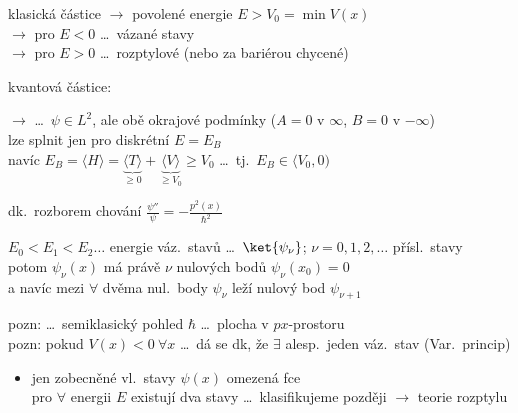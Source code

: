 klasická částice $\to$ povolené energie $E > V_0 = \min V(x)$ \\
\hspace*{3.2cm} $\to$ pro $E < 0$ \dots\ vázané stavy \\
\hspace*{3.2cm} $\to$ pro $E > 0$ \dots\ rozptylové (nebo za bariérou chycené)

kvantová částice:
\begin{veta}
 $\to$  \dots\ $\psi\in L^2$, ale obě okrajové podmínky
($A = 0$ v $\infty$, $B = 0$ v $-\infty$) \\
lze splnit jen pro diskrétní $E = E_B$ \\
navíc \quad $E_B = \langle H\rangle = \underbrace{\langle T\rangle}_{\geq0} + \underbrace{\langle V\rangle}_{\geq V_0} \geq V_0$
\quad \dots\ tj.\ $E_B\in\langle V_0, 0)$
\end{veta}

\begin{veta}
dk.\ rozborem chování $\frac{\psi''}{\psi} = -\frac{p^2(x)}{\hbar^2}$ 

$E_0 < E_1 < E_2 \dots$ energie váz.\ stavů \dots\ $\ket{\psi_\nu}$; $\nu = 0,1,2,\dots$ přísl.\ stavy \\
potom $\psi_\nu(x)$ má právě $\nu$ nulových bodů $\psi_\nu(x_0) = 0$ \\
a navíc mezi $\forall$ dvěma nul.\ body $\psi_\nu$ leží nulový bod $\psi_{\nu+1}$
\end{veta}
pozn: \dots\ semiklasický pohled $\hbar$ \dots\ plocha v $px$-prostoru \\
pozn: pokud $V(x) < 0\ \forall x$ \dots\ dá se dk, že $\exists$ alesp.\ jeden váz.\ stav (Var.\ princip)

\begin{itemize}[nosep]
  \item[$\to$] jen zobecněné vl.\ stavy $\psi(x)$ omezená fce \\
        pro $\forall$ energii $E$ existují dva stavy \dots\ klasifikujeme později $\to$ teorie rozptylu
\end{itemize}


